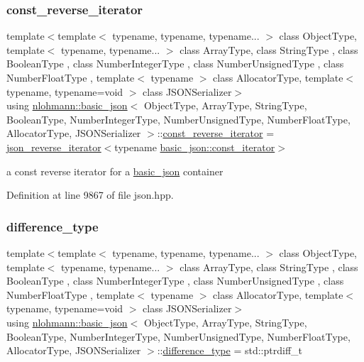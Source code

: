 \subsubsection{\texorpdfstring{const\+\_\+reverse\+\_\+iterator}{const\_reverse\_iterator}}
{\footnotesize\ttfamily template$<$template$<$ typename, typename, typename... $>$ class Object\+Type, template$<$ typename, typename... $>$ class Array\+Type, class String\+Type , class Boolean\+Type , class Number\+Integer\+Type , class Number\+Unsigned\+Type , class Number\+Float\+Type , template$<$ typename $>$ class Allocator\+Type, template$<$ typename, typename=void $>$ class J\+S\+O\+N\+Serializer$>$ \\
using \hyperlink{classnlohmann_1_1basic__json}{nlohmann\+::basic\+\_\+json}$<$ Object\+Type, Array\+Type, String\+Type, Boolean\+Type, Number\+Integer\+Type, Number\+Unsigned\+Type, Number\+Float\+Type, Allocator\+Type, J\+S\+O\+N\+Serializer $>$\+::\hyperlink{classnlohmann_1_1basic__json_a72be3c24bfa24f0993d6c11af03e7404}{const\+\_\+reverse\+\_\+iterator} =  \hyperlink{classnlohmann_1_1basic__json_a8d18136ac63e52780e9d7441981a2db4}{json\+\_\+reverse\+\_\+iterator}$<$typename \hyperlink{classnlohmann_1_1basic__json_a41a70cf9993951836d129bb1c2b3126a}{basic\+\_\+json\+::const\+\_\+iterator}$>$}



a const reverse iterator for a \hyperlink{classnlohmann_1_1basic__json}{basic\+\_\+json} container 



Definition at line 9867 of file json.\+hpp.

\mbox{\label{classnlohmann_1_1basic__json_afe7c1303357e19cea9527af4e9a31d8f}} 
\subsubsection{\texorpdfstring{difference\+\_\+type}{difference\_type}}
{\footnotesize\ttfamily template$<$template$<$ typename, typename, typename... $>$ class Object\+Type, template$<$ typename, typename... $>$ class Array\+Type, class String\+Type , class Boolean\+Type , class Number\+Integer\+Type , class Number\+Unsigned\+Type , class Number\+Float\+Type , template$<$ typename $>$ class Allocator\+Type, template$<$ typename, typename=void $>$ class J\+S\+O\+N\+Serializer$>$ \\
using \hyperlink{classnlohmann_1_1basic__json}{nlohmann\+::basic\+\_\+json}$<$ Object\+Type, Array\+Type, String\+Type, Boolean\+Type, Number\+Integer\+Type, Number\+Unsigned\+Type, Number\+Float\+Type, Allocator\+Type, J\+S\+O\+N\+Serializer $>$\+::\hyperlink{classnlohmann_1_1basic__json_afe7c1303357e19cea9527af4e9a31d8f}{difference\+\_\+type} =  std\+::ptrdiff\+\_\+t}



